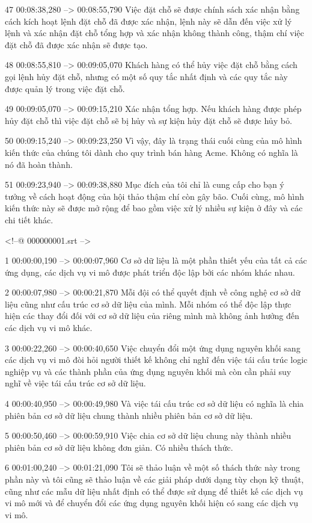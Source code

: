 47
00:08:38,280 --> 00:08:55,790
Việc đặt chỗ sẽ được chính sách xác nhận bằng cách kích hoạt lệnh đặt chỗ đã được xác nhận, lệnh này sẽ dẫn đến việc xử lý lệnh và xác nhận đặt chỗ tổng hợp và xác nhận không thành công, thậm chí việc đặt chỗ đã được xác nhận sẽ được tạo.

48
00:08:55,810 --> 00:09:05,070
Khách hàng có thể hủy việc đặt chỗ bằng cách gọi lệnh hủy đặt chỗ, nhưng có một số quy tắc nhất định và các quy tắc này được quản lý trong việc đặt chỗ.

49
00:09:05,070 --> 00:09:15,210
Xác nhận tổng hợp.  Nếu khách hàng được phép hủy đặt chỗ thì việc đặt chỗ sẽ bị hủy và sự kiện hủy đặt chỗ sẽ được hủy bỏ.

50
00:09:15,240 --> 00:09:23,250
Vì vậy, đây là trạng thái cuối cùng của mô hình kiến ​​thức của chúng tôi dành cho quy trình bán hàng Acme.  Không có nghĩa là nó đã hoàn thành.

51
00:09:23,940 --> 00:09:38,880
Mục đích của tôi chỉ là cung cấp cho bạn ý tưởng về cách hoạt động của hội thảo thậm chí còn gây bão.  Cuối cùng, mô hình kiến ​​thức này sẽ được mở rộng để bao gồm việc xử lý nhiều sự kiện ở đây và các chi tiết khác.

<!--@ 000000001.srt -->

1
00:00:00,190 --> 00:00:07,960
Cơ sở dữ liệu là một phần thiết yếu của tất cả các ứng dụng, các dịch vụ vi mô được phát triển độc lập bởi các nhóm khác nhau.

2
00:00:07,980 --> 00:00:21,870
Mỗi đội có thể quyết định về công nghệ cơ sở dữ liệu cũng như cấu trúc cơ sở dữ liệu của mình.  Mỗi nhóm có thể độc lập thực hiện các thay đổi đối với cơ sở dữ liệu của riêng mình mà không ảnh hưởng đến các dịch vụ vi mô khác.

3
00:00:22,260 --> 00:00:40,650
Việc chuyển đổi một ứng dụng nguyên khối sang các dịch vụ vi mô đòi hỏi người thiết kế không chỉ nghĩ đến việc tái cấu trúc logic nghiệp vụ và các thành phần của ứng dụng nguyên khối mà còn cần phải suy nghĩ về việc tái cấu trúc cơ sở dữ liệu.

4
00:00:40,950 --> 00:00:49,980
Và việc tái cấu trúc cơ sở dữ liệu có nghĩa là chia phiên bản cơ sở dữ liệu chung thành nhiều phiên bản cơ sở dữ liệu.

5
00:00:50,460 --> 00:00:59,910
Việc chia cơ sở dữ liệu chung này thành nhiều phiên bản cơ sở dữ liệu không đơn giản.  Có nhiều thách thức.

6
00:01:00,240 --> 00:01:21,090
Tôi sẽ thảo luận về một số thách thức này trong phần này và tôi cũng sẽ thảo luận về các giải pháp dưới dạng tùy chọn kỹ thuật, cũng như các mẫu dữ liệu nhất định có thể được sử dụng để thiết kế các dịch vụ vi mô mới và để chuyển đổi các ứng dụng nguyên khối hiện có sang các dịch vụ vi mô.

